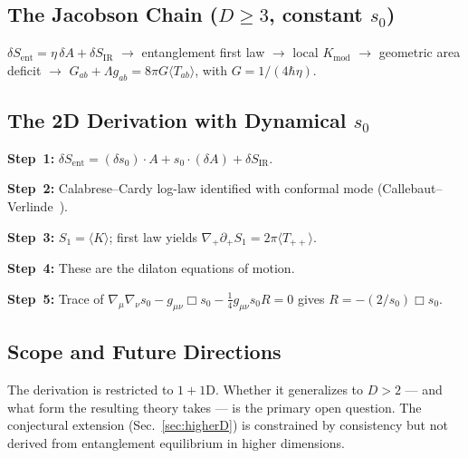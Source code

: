 \documentclass[aps,prd,twocolumn,superscriptaddress,nofootinbib,floatfix]{revtex4-2}
\newcommand{\sn}{s_0}
\newcommand{\Kmod}{K_{\mathrm{mod}}}
\newcommand{\Sent}{S_{\mathrm{ent}}}
\newcommand{\dAlem}{\Box}
\begin{document}
\subsection{The Jacobson Chain (\texorpdfstring{$D \geq 3$}{D >= 3}, constant \texorpdfstring{$\sn$}{s0})}

$\delta\Sent = \eta\,\delta A + \delta S_{\mathrm{IR}}$ $\to$ entanglement first law $\to$ local $\Kmod$ $\to$ geometric area deficit $\to$ $G_{ab} + \Lambda g_{ab} = 8\pi G\langle T_{ab}\rangle$, with $G = 1/(4\hbar\eta)$.

\subsection{The 2D Derivation with Dynamical \texorpdfstring{$\sn$}{s0}}

\textbf{Step~1:} $\delta\Sent = (\delta\sn)\cdot A + \sn\cdot(\delta A) + \delta S_{\mathrm{IR}}$.

\textbf{Step~2:} Calabrese--Cardy log-law identified with conformal mode (Callebaut--Verlinde~\cite{CallebautVerlinde2018}).

\textbf{Step~3:} $S_1 = \langle K\rangle$; first law yields $\nabla_+\partial_+ S_1 = 2\pi\langle T_{++}\rangle$.

\textbf{Step~4:} These are the dilaton equations of motion.

\textbf{Step~5:} Trace of $\nabla_\mu\nabla_\nu\sn - g_{\mu\nu}\dAlem\sn - \tfrac{1}{4}g_{\mu\nu}\sn R = 0$ gives $R = -(2/\sn)\dAlem\sn$.

\subsection{Scope and Future Directions}

The derivation is restricted to $1{+}1$D. Whether it generalizes to $D > 2$ --- and what form the resulting theory takes --- is the primary open question. The conjectural extension (Sec.~\ref{sec:higherD}) is constrained by consistency but not derived from entanglement equilibrium in higher dimensions.
\end{document}
